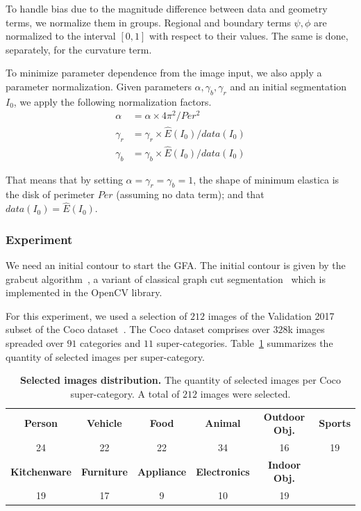 \documentclass[smallextended]{svjour3}
\begin{document}
To handle bias due to the magnitude difference between data and geometry terms, we normalize them in groups. Regional and boundary terms $\psi,\phi$ are normalized to the interval $[0,1]$ with respect to their values. The same is done, separately, for the curvature term.

To minimize parameter dependence from the image input, we also apply a parameter normalization. Given parameters $\alpha, \gamma_b, \gamma_r$ and an initial segmentation $I_0$, we apply the following normalization factors.
%
\begin{align*}
	\alpha & = \alpha \times 4\pi^2/Per^2 \\
	\gamma_r & = \gamma_r \times \hat{E}(I_0)/data(I_0) \\	
	\gamma_b & = \gamma_b \times \hat{E}(I_0)/data(I_0)		
\end{align*}

That means that by setting $\alpha=\gamma_r=\gamma_b=1$, the shape of minimum elastica is the disk of perimeter $Per$ (assuming no data term); and that $data(I_0)=\hat{E}(I_0)$.
%
%
\subsubsection{Experiment}
We need an initial contour to start the GFA. The initial contour is given by the grabcut algorithm~\cite{rother04grabcut}, a variant of classical graph cut segmentation~\cite{boykov01graphcut} which is implemented in the OpenCV library.

For this experiment, we used a selection of $212$ images of the Validation 2017 subset of the Coco dataset~\cite{lin2014microsoft}. The Coco dataset comprises over $328$k images spreaded over $91$ categories and $11$ super-categories. Table~\ref{tab:image-categories-distribution} summarizes the quantity of selected images per super-category. 
%
%
\begin{table}
\begin{tabular}{cccccc}
\textbf{Person} & \textbf{Vehicle} & \textbf{Food} & \textbf{Animal} & \textbf{Outdoor Obj.} & \textbf{Sports} \\
24 & 22 & 22 & 34 & 16 & 19 \\[1em]
\textbf{Kitchenware} & \textbf{Furniture} & \textbf{Appliance} & \textbf{Electronics} & \textbf{Indoor Obj.} & \\
19 & 17 & 9 & 10 & 19 &
\end{tabular}
\caption{\textbf{Selected images distribution.} The quantity of selected images per Coco super-category. A total of $212$ images were selected.}
\label{tab:image-categories-distribution}
\end{table}
%
%
\end{document}
